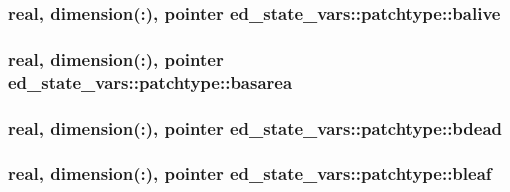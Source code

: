 \subsubsection[{\texorpdfstring{balive}{balive}}]{\setlength{\rightskip}{0pt plus 5cm}real, dimension(\+:), pointer ed\+\_\+state\+\_\+vars\+::patchtype\+::balive}\hypertarget{structed__state__vars_1_1patchtype_a6fc008c912d88b39dfac54881cba6bbf}{}\label{structed__state__vars_1_1patchtype_a6fc008c912d88b39dfac54881cba6bbf}
\subsubsection[{\texorpdfstring{basarea}{basarea}}]{\setlength{\rightskip}{0pt plus 5cm}real, dimension(\+:), pointer ed\+\_\+state\+\_\+vars\+::patchtype\+::basarea}\hypertarget{structed__state__vars_1_1patchtype_a7d6b4a6fd1c3a73ffdf2f722d49e94ca}{}\label{structed__state__vars_1_1patchtype_a7d6b4a6fd1c3a73ffdf2f722d49e94ca}
\subsubsection[{\texorpdfstring{bdead}{bdead}}]{\setlength{\rightskip}{0pt plus 5cm}real, dimension(\+:), pointer ed\+\_\+state\+\_\+vars\+::patchtype\+::bdead}\hypertarget{structed__state__vars_1_1patchtype_a9d2c3c9798a4fd70b8fa50ef5d6e114b}{}\label{structed__state__vars_1_1patchtype_a9d2c3c9798a4fd70b8fa50ef5d6e114b}
\subsubsection[{\texorpdfstring{bleaf}{bleaf}}]{\setlength{\rightskip}{0pt plus 5cm}real, dimension(\+:), pointer ed\+\_\+state\+\_\+vars\+::patchtype\+::bleaf}\hypertarget{structed__state__vars_1_1patchtype_a5afc29e900a7a1515a63799d269f0a14}{}\label{structed__state__vars_1_1patchtype_a5afc29e900a7a1515a63799d269f0a14}

